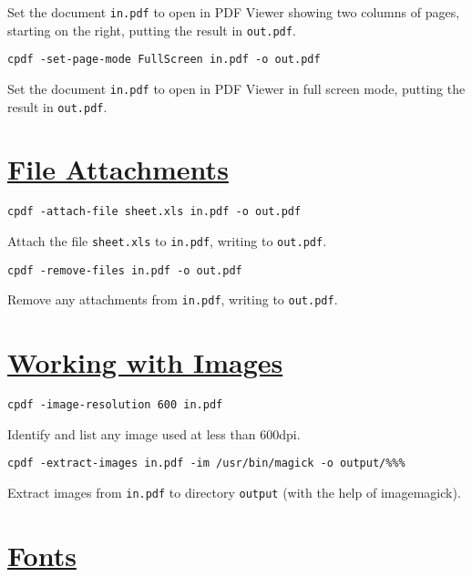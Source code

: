 \documentclass{book}
\begin{document}
\noindent Set the document \texttt{in.pdf} to open in PDF Viewer showing two columns of pages, starting on the right, putting the result in \texttt{out.pdf}.

\begin{framed}\noindent\texttt{cpdf -set-page-mode FullScreen in.pdf -o out.pdf}\end{framed}

\noindent Set the document \texttt{in.pdf} to open in PDF Viewer in full screen mode, putting the result in \texttt{out.pdf}.

\section*{\hyperref[chap:12]{File Attachments}}

\begin{framed}\noindent\texttt{cpdf -attach-file sheet.xls in.pdf -o out.pdf}\end{framed}

\noindent Attach the file \texttt{sheet.xls} to \texttt{in.pdf}, writing to \texttt{out.pdf}.

\begin{framed}\noindent\texttt{cpdf -remove-files in.pdf -o out.pdf}\end{framed}

\noindent Remove any attachments from \texttt{in.pdf}, writing to \texttt{out.pdf}.

\section*{\hyperref[chap:13]{Working with Images}}

\begin{framed}\noindent\texttt{cpdf -image-resolution 600 in.pdf}\end{framed}

\noindent Identify and list any image used at less than 600dpi.

\begin{framed}\noindent\texttt{cpdf -extract-images in.pdf -im /usr/bin/magick -o output/\%\%\%}\end{framed}

\noindent Extract images from \texttt{in.pdf} to directory \texttt{output} (with the help of imagemagick).


\section*{\hyperref[chap:14]{Fonts}}
\end{document}
